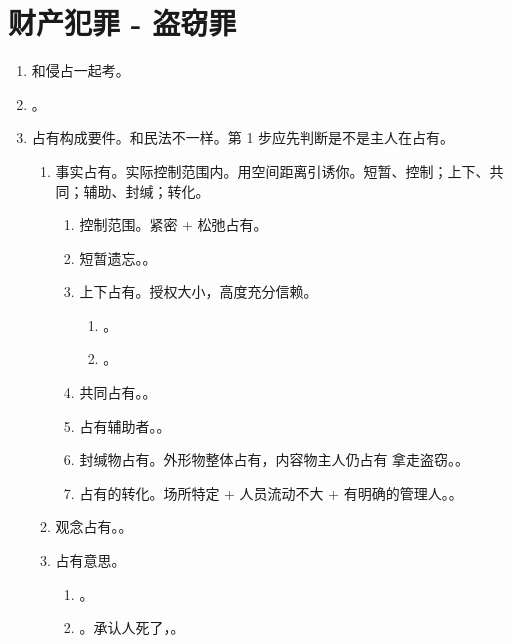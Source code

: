 \section{财产犯罪 - 盗窃罪}
\begin{enumerate}
  \item 和侵占一起考。
  \item {}。
  \item 占有构成要件。和民法不一样。第 1 步应先判断是不是主人在占有。
        \begin{enumerate}
          \item 事实占有。实际控制范围内。用空间距离引诱你。短暂、控制；上下、共同；辅助、封缄；转化。
                \begin{enumerate}
                  \item 控制范围。紧密 + 松弛占有。
                  \item 短暂遗忘。。
                  \item 上下占有。授权大小，高度充分信赖。
                        \begin{enumerate}
                          \item {}。
                          \item {}。
                        \end{enumerate}
                  \item 共同占有。。
                  \item 占有辅助者。。
                  \item 封缄物占有。外形物整体占有，内容物主人仍占有 \yjt 拿走盗窃。。
                  \item 占有的转化。场所特定 + 人员流动不大 + 有明确的管理人。。
                \end{enumerate}
          \item 观念占有。。
          \item 占有意思。
                \begin{enumerate}
                  \item {}。
                  \item {}。承认人死了，。

\end{enumerate}
\end{enumerate}
\end{enumerate}
